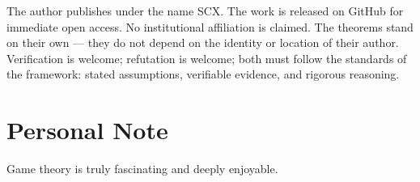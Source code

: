 \documentclass[12pt,a4paper]{ctexart}
\theoremstyle{definition}
\theoremstyle{remark}
\begin{document}
The author publishes under the name SCX. The work is released on GitHub for immediate open access. No institutional affiliation is claimed. The theorems stand on their own — they do not depend on the identity or location of their author. Verification is welcome; refutation is welcome; both must follow the standards of the framework: stated assumptions, verifiable evidence, and rigorous reasoning.

\section*{Personal Note}

Game theory is truly fascinating and deeply enjoyable.
\end{document}
